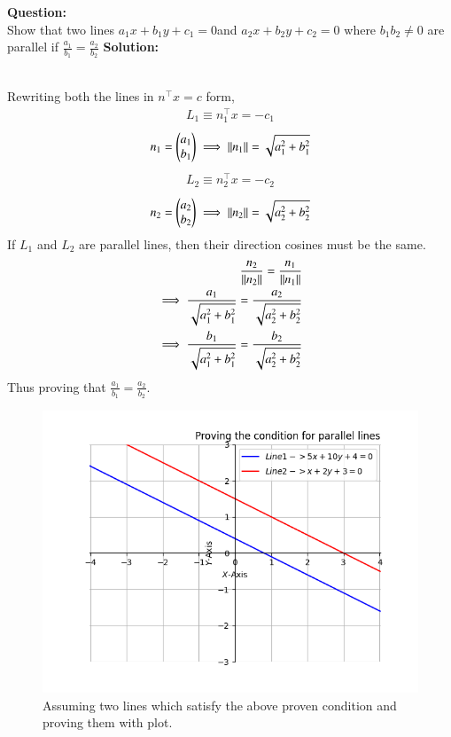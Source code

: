 \documentclass[journal]{IEEEtran}
\begin{document}
\textbf{Question: }\\
Show that two lines  $a_1 x+ b_1y + c_1 = 0 $and $a_2 x+ b_2 y + c_2 = 0$ where $b_1 b_2 \neq 0$ are parallel if
$\frac{a_1}{b_1} = \frac{a_2}{b_2}$
\textbf{Solution: } \\
\begin{table}[h!]    
	\centering
	
	\caption{}
\end{table}\\
Rewriting both the lines in $n^\top x = c$ form,
	\begin{align}
		L_1 \equiv n_1^\top x = -c_1
	\end{align}
	\begin{align}
		n_1 = \begin{pmatrix}a_1 \\ b_1\end{pmatrix}  \implies 		\left\lVert n_1\right\rVert = \sqrt{a_1^2 + b_1^2}
	\end{align}
	\begin{align}
		L_2 \equiv n_2^\top x = -c_2
	\end{align}
	\begin{align}
		n_2 = \begin{pmatrix}a_2 \\ b_2\end{pmatrix}  \implies 		\left\lVert n_2\right\rVert = \sqrt{a_2^2 + b_2^2}
	\end{align}
If $L_1$ and $L_2$ are parallel lines, then their direction cosines must be the same.
	\begin{align}
		\frac{n_2}{\left\lVert n_2\right\rVert} = \frac{n_1}{\left\lVert n_1\right\rVert}\\
		 \implies \frac{a_1}{\sqrt{a_1^2 + b_1^2}} = \frac{a_2}{\sqrt{a_2^2 + b_2^2}}\\
		 \implies \frac{b_1}{\sqrt{a_1^2 + b_1^2}} = \frac{b_2}{\sqrt{a_2^2 + b_2^2}}
	\end{align}
	Thus proving that $\frac{a_1}{b_1} = \frac{a_2}{b_2}$.\\
	\begin{figure}[h!]
		\centering
		\includegraphics[width=0.7\linewidth]{figs/fig1.png}
		\caption{Assuming two lines which satisfy the above proven condition and proving them with plot. }
	\end{figure}	
\end{document}
